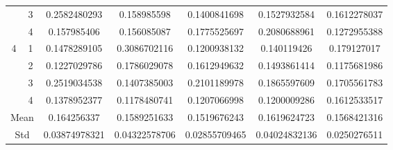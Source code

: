 \documentclass[draft,dvipsnames]{drexel-thesis}
\begin{document}
\begin{thesis}
\begin{table}[!t]
\begin{tabular}{|c|c|c|c|c|c|c|}
                      & 3                   & 0.2582480293  & 0.158985598   & 0.1400841698  & 0.1527932584  & 0.1612278037 \\ \cline{2-7}
                      & 4                   & 0.157985406   & 0.156085087   & 0.1775525697  & 0.2080688961  & 0.1272955388 \\ \hline
\multirow{4}{*}{4}    & 1                   & 0.1478289105  & 0.3086702116  & 0.1200938132  & 0.140119426   & 0.179127017  \\ \cline{2-7}
                      & 2                   & 0.1227029786  & 0.1786029078  & 0.1612949632  & 0.1493861414  & 0.1175681986 \\ \cline{2-7}
                      & 3                   & 0.2519034538  & 0.1407385003  & 0.2101189978  & 0.1865597609  & 0.1705561783 \\ \cline{2-7}
                      & 4                   & 0.1378952377  & 0.1178480741  & 0.1207066998  & 0.1200009286  & 0.1612533517 \\ \hline
\multicolumn{2}{|c|}{Mean}                  & 0.164256337   & 0.1589251633  & 0.1519676243  & 0.1619624723  & 0.1568421316 \\ \hline
\multicolumn{2}{|c|}{Std}                   & 0.03874978321 & 0.04322578706 & 0.02855709465 & 0.04024832136 & 0.0250276511 \\ \hline
\end{tabular}
\end{table}


\end{thesis}
\end{document}
